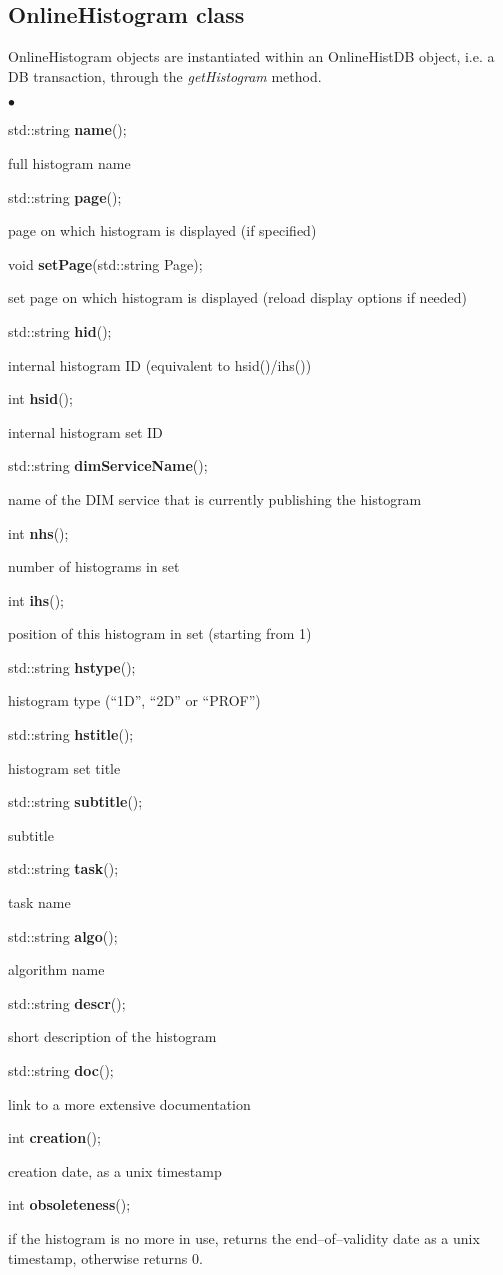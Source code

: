 \documentclass{lhcbnote}
\begin{document}
\subsection{OnlineHistogram class}

OnlineHistogram objects are instantiated within an
OnlineHistDB object, i.e. a DB transaction, through the {\it
getHistogram} method.

\begin{list}{$\bullet$}{}
\item   std::string {\bf name}();

full histogram name
\item   std::string {\bf page}();

page on which histogram is displayed (if specified)
\item void {\bf setPage}(std::string Page);

set page on which histogram is displayed (reload display options if needed)


\item   std::string {\bf hid}();

internal histogram ID (equivalent to hsid()/ihs())
\item   int {\bf hsid}();

internal histogram set ID
\item   std::string {\bf dimServiceName}();

name of the DIM service that is currently publishing the histogram 
\item   int {\bf nhs}();

number of histograms in set
\item   int {\bf ihs}();

position of this histogram in set (starting from 1)
\item   std::string {\bf  hstype}();

histogram type (``1D'', ``2D'' or ``PROF'')
\item   std::string {\bf hstitle}();

histogram set title
\item   std::string {\bf subtitle}();

subtitle 
\item   std::string {\bf task}();

task name
\item   std::string {\bf algo}();

algorithm name

\item   std::string {\bf descr}();

short description of the histogram
\item   std::string {\bf doc}();

link to a more extensive documentation

\item   int {\bf creation}();

creation date, as a unix timestamp
\item   int {\bf obsoleteness}();

if the histogram is no more in use, returns the end--of--validity date
as a unix timestamp, otherwise returns 0. 
\end{list}
\end{document}
